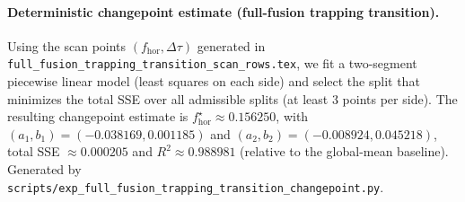 \paragraph{Deterministic changepoint estimate (full-fusion trapping transition).} \AuditTag Using the scan points $(f_{\mathrm{hor}},\Delta\tau)$ generated in \texttt{full\_fusion\_trapping\_transition\_scan\_rows.tex}, we fit a two-segment piecewise linear model (least squares on each side) and select the split that minimizes the total SSE over all admissible splits (at least 3 points per side). The resulting changepoint estimate is $f_{\mathrm{hor}}^\star\approx 0.156250$, with $(a_1,b_1)=(-0.038169,0.001185)$ and $(a_2,b_2)=(-0.008924,0.045218)$, total SSE $\approx 0.000205$ and $R^2\approx 0.988981$ (relative to the global-mean baseline). Generated by \texttt{scripts/exp\_full\_fusion\_trapping\_transition\_changepoint.py}.